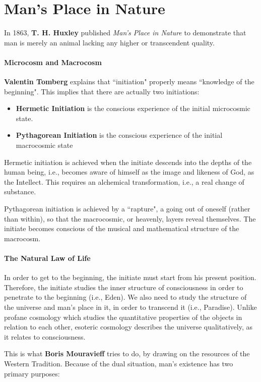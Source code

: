 \section{Man's Place in Nature}

In 1863, \textbf{T. H. Huxley} published \emph{Man's Place in Nature} to demonstrate that man is merely an animal lacking any higher or transcendent quality.

\paragraph{Microcosm and Macrocosm}
\textbf{Valentin Tomberg} explains that ``initiation" properly means ``knowledge of the beginning". This implies that there are actually two initiations:

\begin{itemize}
\item \textbf{Hermetic Initiation} is the conscious experience of the initial microcosmic state. 
\item \textbf{Pythagorean Initiation} is the conscious experience of the initial macrocosmic state 
\end{itemize}
Hermetic initiation is achieved when the initiate descends into the depths of the human being, i.e., becomes aware of himself as the image and likeness of God, as the Intellect. This requires an alchemical transformation, i.e., a real change of substance.

Pythagorean initiation is achieved by a ``rapture", a going out of oneself (rather than within), so that the macrocosmic, or heavenly, layers reveal themselves. The initiate becomes conscious of the musical and mathematical structure of the macrocosm.

\paragraph{The Natural Law of Life}
In order to get to the beginning, the initiate must start from his present position. Therefore, the initiate studies the inner structure of consciousness in order to penetrate to the beginning (i.e., Eden). We also need to study the structure of the universe and man's place in it, in order to transcend it (i.e., Paradise). Unlike profane cosmology which studies the quantitative properties of the objects in relation to each other, esoteric cosmology describes the universe qualitatively, as it relates to consciousness.

This is what \textbf{Boris Mouravieff} tries to do, by drawing on the resources of the Western Tradition. Because of the dual situation, man's existence has two primary purposes:

